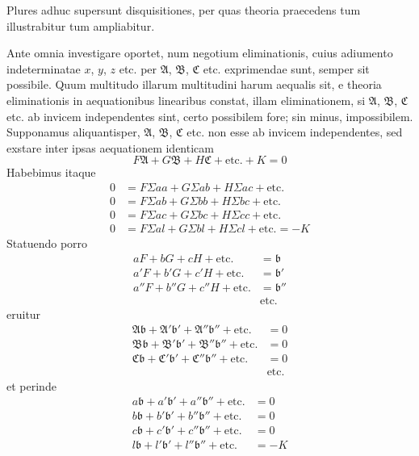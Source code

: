\documentclass[12pt,a4paper]{book}
\begin{document}
Plures adhuc supersunt disquisitiones, per quas theoria praecedens tum illustrabitur tum ampliabitur.

Ante omnia investigare oportet, num negotium eliminationis, cuius adiumento indeterminatae $x$, $y$, $z$ etc. per $\mathfrak{A}$, $\mathfrak{B}$, $\mathfrak{C}$ etc. exprimendae sunt, semper sit possibile. Quum multitudo illarum multitudini harum aequalis sit, e theoria eliminationis in aequationibus linearibus constat, illam eliminationem, si $\mathfrak{A}$, $\mathfrak{B}$, $\mathfrak{C}$ etc. ab invicem independentes sint, certo possibilem fore; sin minus, impossibilem. Supponamus aliquantisper, $\mathfrak{A}$, $\mathfrak{B}$, $\mathfrak{C}$ etc. non esse ab invicem independentes, sed exstare inter ipsas aequationem identicam
%
\begin{equation*}
F\mathfrak{A}+G\mathfrak{B}+H\mathfrak{C}+\text{etc.}+K=0
\end{equation*}
Habebimus itaque
%
\begin{align*}
0 &= F\Sigma aa+G\Sigma ab+H\Sigma ac+\text{etc.}\\
0 &= F\Sigma ab+G\Sigma bb+H\Sigma bc+\text{etc.}\\
0 &= F\Sigma ac+G\Sigma bc+H\Sigma cc+\text{etc.}\\
0 &= F\Sigma al+G\Sigma bl+H\Sigma cl+\text{etc.}=-K
\end{align*}
Statuendo porro
%
\begin{equation*}
\begin{aligned}
aF+bG+cH+\text{etc.}&=\mathfrak{b}\\
a'F+b'G+c'H+\text{etc.}&=\mathfrak{b}'\\
a''F+b''G+c''H+\text{etc.}&=\mathfrak{b}''\\
&\text{etc.}
\end{aligned}\tag{I}
\end{equation*}
eruitur
%
\begin{align*}
\mathfrak{A}\mathfrak{b}+\mathfrak{A}'\mathfrak{b}'+\mathfrak{A}''\mathfrak{b}''+\text{etc.}&=0\\
\mathfrak{B}\mathfrak{b}+\mathfrak{B}'\mathfrak{b}'+\mathfrak{B}''\mathfrak{b}''+\text{etc.}&=0\\
\mathfrak{C}\mathfrak{b}+\mathfrak{C}'\mathfrak{b}'+\mathfrak{C}''\mathfrak{b}''+\text{etc.}&=0\\
&\text{etc.}
\end{align*}
et perinde
%
\begin{align*}
a\mathfrak{b}+a'\mathfrak{b}'+a''\mathfrak{b}''+\text{etc.}&=0\\
b\mathfrak{b}+b'\mathfrak{b}'+b''\mathfrak{b}''+\text{etc.}&=0\\
c\mathfrak{b}+c'\mathfrak{b}'+c''\mathfrak{b}''+\text{etc.}&=0\\
l\mathfrak{b}+l'\mathfrak{b}'+l''\mathfrak{b}''+\text{etc.}&=-K
\end{align*}
\end{document}
